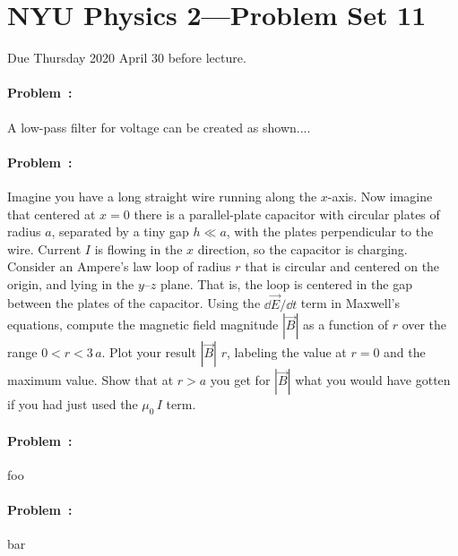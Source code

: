\documentclass[12pt]{article}
\begin{document}
\section*{NYU Physics 2---Problem Set 11}

Due Thursday 2020 April 30 before lecture.

\paragraph{Problem~\theproblem:}%
A low-pass filter for voltage can be created as shown....

\paragraph{Problem~\theproblem:}%
Imagine you have a long straight wire running along the $x$-axis.
Now imagine that centered at $x=0$ there is a parallel-plate capacitor
with circular plates of radius $a$, separated by a tiny gap $h\ll a$,
with the plates perpendicular to the wire.
Current $I$ is flowing in the $x$ direction, so the capacitor is charging.
Consider an Ampere's law loop of radius $r$ that is circular
and centered on the origin, and lying in the $y$--$z$ plane.
That is, the loop is centered in the gap between the plates of the capacitor.
Using the $\dd\vec{E}/\dd t$ term in Maxwell's equations,
compute the magnetic field magnitude $|\vec{B}|$ as a function of $r$ over
the range $0<r<3\,a$.
Plot your result $|\vec{B}|$  $r$, labeling the value at
$r=0$ and the maximum value.
Show that at $r>a$ you get for $|\vec{B}|$ what you would have gotten if you had just used
the $\mu_0\,I$ term.

\paragraph{Problem~\theproblem:}%
foo

\paragraph{Problem~\theproblem:}%
bar
\end{document}
